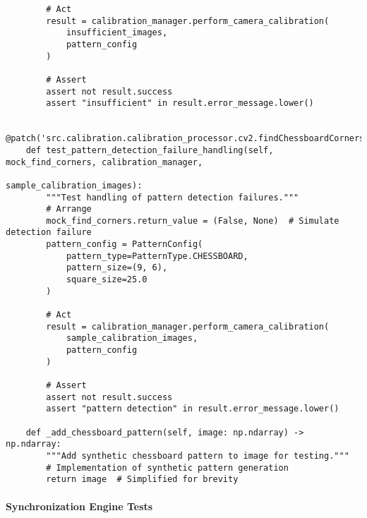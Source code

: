 \documentclass[12pt,a4paper]{report}
\begin{document}
\begin{verbatim}
        # Act
        result = calibration_manager.perform_camera_calibration(
            insufficient_images,
            pattern_config
        )

        # Assert
        assert not result.success
        assert "insufficient" in result.error_message.lower()

    @patch('src.calibration.calibration_processor.cv2.findChessboardCorners')
    def test_pattern_detection_failure_handling(self, mock_find_corners, calibration_manager,
                                                sample_calibration_images):
        """Test handling of pattern detection failures."""
        # Arrange
        mock_find_corners.return_value = (False, None)  # Simulate detection failure
        pattern_config = PatternConfig(
            pattern_type=PatternType.CHESSBOARD,
            pattern_size=(9, 6),
            square_size=25.0
        )

        # Act
        result = calibration_manager.perform_camera_calibration(
            sample_calibration_images,
            pattern_config
        )

        # Assert
        assert not result.success
        assert "pattern detection" in result.error_message.lower()

    def _add_chessboard_pattern(self, image: np.ndarray) -> np.ndarray:
        """Add synthetic chessboard pattern to image for testing."""
        # Implementation of synthetic pattern generation
        return image  # Simplified for brevity
\end{verbatim}

\paragraph{Synchronization Engine Tests}
\end{document}
